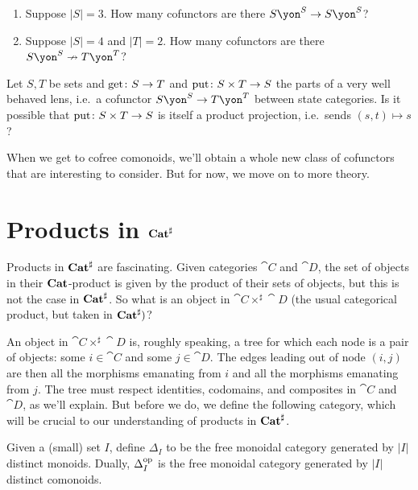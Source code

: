 \documentclass[Book-Poly]{subfiles}
\begin{document}
\begin{exercise}\label{exc.how_many_vwbls}
\begin{enumerate}
	\item Suppose $|S|=3$. How many cofunctors are there $S\yon^S\to S\yon^S$?
	\item Suppose $|S|=4$ and $|T|=2$. How many cofunctors are there $S\yon^S\cof T\yon^T$?
\qedhere
\end{enumerate}
\end{exercise}

\begin{exercise}
Let $S,T$ be sets and $\mathrm{get}\colon S\to T$ and $\mathrm{put}\colon S\times T\to S$ the parts of a very well behaved lens, i.e.\ a cofunctor $S\yon^S\to T\yon^T$ between state categories. Is it possible that $\mathrm{put}\colon S\times T\to S$ is itself a product projection, i.e.\ sends $(s,t)\mapsto s$?
\end{exercise}

When we get to cofree comonoids, we'll obtain a whole new class of cofunctors that are interesting to consider. But for now, we move on to more theory.

\section{Products in $\mathbf{Cat}^\sharp$}

Products in $\mathbf{Cat}^\sharp$ are fascinating. Given categories $\cat{C}$ and $\cat{D}$, the set of objects in their $\mathbf{Cat}$-product is given by the product of their sets of objects, but this is not the case in $\mathbf{Cat}^\sharp$. So what is an object in $\cat{C}\times^\sharp\cat{D}$ (the usual categorical product, but taken in $\mathbf{Cat}^\sharp)$? 

An object in $\cat{C}\times^\sharp\cat{D}$ is, roughly speaking, a tree for which each node is a pair of objects: some $i\in\cat{C}$ and some $j\in\cat{D}$.
The edges leading out of node $(i, j)$ are then all the morphisms emanating from $i$ and all the morphisms emanating from $j$.
The tree must respect identities, codomains, and composites in $\cat{C}$ and $\cat{D}$, as we'll explain.
But before we do, we define the following category, which will be crucial to our understanding of products in $\mathbf{Cat}^\sharp$.

\begin{definition} \label{def.free_monoid_cat}
Given a (small) set $I$, define $\Delta_I$ to be the free monoidal category generated by $|I|$ distinct monoids.
Dually, $\Delta_I^{\textnormal{op}}$ is the free monoidal category generated by $|I|$ distinct comonoids.
\end{definition}
\end{document}
